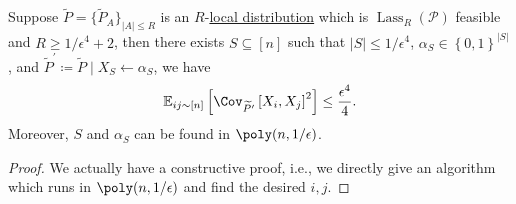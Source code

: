 \begin{theorem}\label{thm:lec16}
	Suppose \(\widetilde{P} =\{ \widetilde{P} _A \}_{\left\vert A \right\vert \leq R} \) is an \(R\)-\hyperref[def:local-distribution]{local distribution} which is \(\mathop{\mathrm{Lass}}_R(\mathcal{P})\) feasible and \(R \geq 1 / \epsilon ^4 + 2\), then there exists \(S \subseteq [n]\) such that \(\left\vert S \right\vert \leq 1 / \epsilon ^4\), \(\alpha _S \in \left\{ 0, 1 \right\} ^{\left\vert S \right\vert }\), and \(\widetilde{P} ^\prime \coloneqq \widetilde{P} \mid X_S\gets \alpha _S\), we have
	\[
		\mathbb{E}_{ij\sim [n]}\left[\Cov_{\widetilde{P} ^\prime }\left[X_i, X_j \right]^{2} \right] \leq \frac{\epsilon ^4}{4}.
	\]
	Moreover, \(S\) and \(\alpha _S\) can be found in \(\poly(n, 1 / \epsilon )\).
\end{theorem}
\begin{proof}
	We actually have a constructive proof, i.e., we directly give an algorithm which runs in \(\poly(n, 1 / \epsilon )\) and find the desired \(i, j\).


\end{proof}
